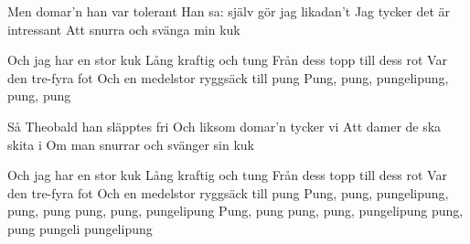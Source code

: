{    Men domar'n han var tolerant
    Han sa: själv gör jag likadan't
    Jag tycker det är intressant
    Att snurra och svänga min kuk
   
    Och jag har en stor kuk
    Lång kraftig och tung
    Från dess topp till dess rot
    Var den tre-fyra fot
    Och en medelstor ryggsäck till pung
    Pung, pung, pungelipung, pung, pung
   
    Så Theobald han släpptes fri
    Och liksom domar'n tycker vi
    Att damer de ska skita i
    Om man snurrar och svänger sin kuk
   
    Och jag har en stor kuk
    Lång kraftig och tung
    Från dess topp till dess rot
    Var den tre-fyra fot
    Och en medelstor ryggsäck till pung
    Pung, pung, pungelipung, pung, pung
    pung, pung, pungelipung
    Pung, pung pung, pung, pungelipung
    pung, pung pungeli pungelipung}

\newpage 

